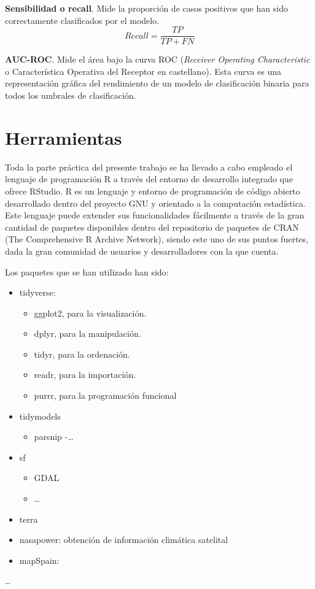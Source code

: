 \documentclass[12pt,a4paper,]{book}
\providecommand{\tightlist}{%
  \setlength{\itemsep}{0pt}\setlength{\parskip}{0pt}}
\numberwithin{dummy}{section}
\theoremstyle{ocrenumbox}
\theoremstyle{blacknumex}
\theoremstyle{blacknumbox}
\theoremstyle{ocrenum}
\theoremstyle{ocrenum}
\begin{document}
\textbf{Sensibilidad o recall}. Mide la proporción de casos positivos
que han sido correctamente clasificados por el modelo.
\[ Recall = \frac{TP}{TP + FN}\]

\textbf{AUC-ROC}. Mide el área bajo la curva ROC (\emph{Receiver
Operating Characteristic} o Característica Operativa del Receptor en
castellano). Esta curva es una representación gráfica del rendimiento de
un modelo de clasificación binaria para todos los umbrales de
clasificación.

\hypertarget{herramientas}{%
\section{Herramientas}\label{herramientas}}

Toda la parte práctica del presente trabajo se ha llevado a cabo
empleado el lenguaje de programación R a través del entorno de
desarrollo integrado que ofrece RStudio. R es un lenguaje y entorno de
programación de código abierto desarrollado dentro del proyecto GNU y
orientado a la computación estadística. Este lenguaje puede extender sus
funcionalidades fácilmente a través de la gran cantidad de paquetes
disponibles dentro del repositorio de paquetes de CRAN (The
Comprehensive R Archive Network), siendo este uno de sus puntos fuertes,
dada la gran comunidad de usuarios y desarrolladores con la que cuenta.

Los paquetes que se han utilizado han sido:

\begin{itemize}
\item
  tidyverse:

  \begin{itemize}
  \tightlist
  \item
    ggplot2, para la visualización.
  \item
    dplyr, para la manipulación.
  \item
    tidyr, para la ordenación.
  \item
    readr, para la importación.
  \item
    purrr, para la programación funcional
  \end{itemize}
\item
  tidymodels

  \begin{itemize}
  \tightlist
  \item
    parsnip -\ldots{}
  \end{itemize}
\item
  sf

  \begin{itemize}
  \tightlist
  \item
    GDAL
  \item
    \ldots{}
  \end{itemize}
\item
  terra
\item
  nasapower: obtención de información climática satelital
\item
  mapSpain:
\end{itemize}

\ldots{}




%
\end{document}
